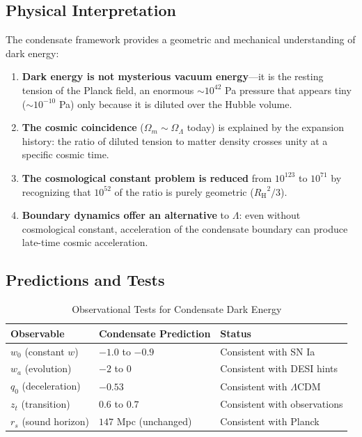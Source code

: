 \documentclass[11pt,a4paper]{article}
\newcommand{\RH}{\ensuremath{R_{\mathrm{H}}}}
\newcommand{\OmegaLam}{\ensuremath{\Omega_\Lambda}}
\newcommand{\OmegaM}{\ensuremath{\Omega_m}}
\theoremstyle{definition}
\theoremstyle{remark}
\begin{document}
\subsection{Physical Interpretation}

The condensate framework provides a geometric and mechanical understanding of dark energy:

\begin{enumerate}[leftmargin=*, itemsep=0.3em]
\item \textbf{Dark energy is not mysterious vacuum energy}---it is the resting tension of the Planck field, an enormous $\sim 10^{42}$ Pa pressure that appears tiny ($\sim 10^{-10}$ Pa) only because it is diluted over the Hubble volume.

\item \textbf{The cosmic coincidence} ($\OmegaM \sim \OmegaLam$ today) is explained by the expansion history: the ratio of diluted tension to matter density crosses unity at a specific cosmic time.

\item \textbf{The cosmological constant problem is reduced} from $10^{123}$ to $10^{71}$ by recognizing that $10^{52}$ of the ratio is purely geometric ($\RH^2/3$).

\item \textbf{Boundary dynamics offer an alternative} to $\Lambda$: even without cosmological constant, acceleration of the condensate boundary can produce late-time cosmic acceleration.
\end{enumerate}

\subsection{Predictions and Tests}

\begin{table}[H]
\centering
\caption{Observational Tests for Condensate Dark Energy}
\label{tab:tests}
\begin{tabular}{@{}lll@{}}
\toprule
\textbf{Observable} & \textbf{Condensate Prediction} & \textbf{Status} \\
\midrule
$w_0$ (constant $w$) & $-1.0$ to $-0.9$ & Consistent with SN Ia \\
$w_a$ (evolution) & $-2$ to $0$ & Consistent with DESI hints \\
$q_0$ (deceleration) & $-0.53$ & Consistent with $\Lambda$CDM \\
$z_t$ (transition) & $0.6$ to $0.7$ & Consistent with observations \\
$r_s$ (sound horizon) & $147$ Mpc (unchanged) & Consistent with Planck \\
\bottomrule
\end{tabular}
\end{table}
\end{document}
